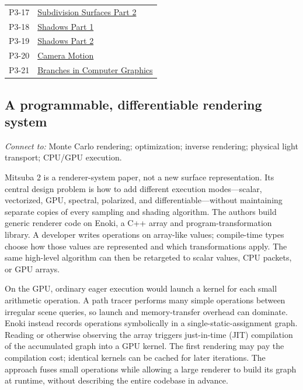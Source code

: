 {\begin{longtable}[]{@{}
  >{\raggedright\arraybackslash}p{}
  >{\raggedright\arraybackslash}p{}@{}}
P3-17 & \href{https://www.youtube.com/watch?v=THiF7-QxKXk}{Subdivision Surfaces Part 2} \\
P3-18 & \href{https://www.youtube.com/watch?v=kmdRmXuOjIY}{Shadows Part 1} \\
P3-19 & \href{https://www.youtube.com/watch?v=qiJhB0fOY6I}{Shadows Part 2} \\
P3-20 & \href{https://www.youtube.com/watch?v=HAJv25Afsz8}{Camera Motion} \\
P3-21 & \href{https://www.youtube.com/watch?v=NEIJW3ZJ1GE}{Branches in Computer Graphics} \\
\end{longtable}
}

\subsection{A programmable, differentiable rendering system}\label{03-visual-computing-i-ch011-a-programmable-differentiable-rendering-system}

\hypertarget{03-visual-computing-i-ch011-a-programmable-differentiable-rendering-system}{}

\emph{Connect to:} Monte Carlo rendering; optimization; inverse rendering; physical light transport; CPU/GPU execution.

Mitsuba 2 is a renderer-system paper, not a new surface representation. Its central design problem is how to add different execution modes---scalar, vectorized, GPU, spectral, polarized, and differentiable---without maintaining separate copies of every sampling and shading algorithm. The authors build generic renderer code on Enoki, a C++ array and program-transformation library. A developer writes operations on array-like values; compile-time types choose how those values are represented and which transformations apply. The same high-level algorithm can then be retargeted to scalar values, CPU packets, or GPU arrays.

On the GPU, ordinary eager execution would launch a kernel for each small arithmetic operation. A path tracer performs many simple operations between irregular scene queries, so launch and memory-transfer overhead can dominate. Enoki instead records operations symbolically in a single-static-assignment graph. Reading or otherwise observing the array triggers just-in-time (JIT) compilation of the accumulated graph into a GPU kernel. The first rendering may pay the compilation cost; identical kernels can be cached for later iterations. The approach fuses small operations while allowing a large renderer to build its graph at runtime, without describing the entire codebase in advance.

